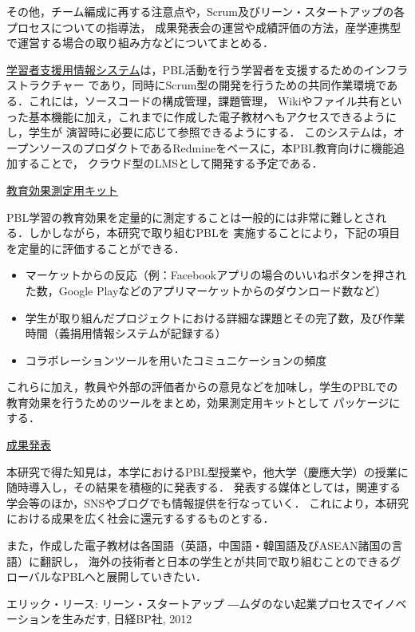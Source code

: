 \documentclass[11pt,a4paper,twoside]{jarticle}
\newcommand{\研究種別}{A}	%
\newcommand{\研究課題名}{コ・クリエイティブなソフトウェア開発者を育成するPBL型教育}
\newcommand{\研究機関名}{産業技術大学院大学}
\newcommand{\研究代表者氏名}{中鉢　欣秀}
\newcommand{\研究代表者氏名ふりがな}{ちゅうばち　よしひで}
\newcommand{\本応募effort}{\KLEffort{18}}	%
\newcommand{\研究期間の最終元号年度}{27}	%
\begin{document}
{	その他，チーム編成に再する注意点や，Scrum及びリーン・スタートアップの各プロセスについての指導法，
	成果発表会の運営や成績評価の方法，産学連携型で運営する場合の取り組み方などについてまとめる．
	
	\vspace{0.5cm}
	\underline{学習者支援用情報システム}は，PBL活動を行う学習者を支援するためのインフラストラクチャー
	であり，同時にScrum型の開発を行うための共同作業環境である．これには，ソースコードの構成管理，課題管理，
	Wikiやファイル共有といった基本機能に加え，これまでに作成した電子教材へもアクセスできるようにし，学生が
	演習時に必要に応じて参照できるようにする．
	このシステムは，オープンソースのプロダクトであるRedmineをベースに，本PBL教育向けに機能追加することで，
	クラウド型のLMSとして開発する予定である．

	\vspace{0.5cm}
	\underline{教育効果測定用キット}
	
	PBL学習の教育効果を定量的に測定することは一般的には非常に難しとされる．しかしながら，本研究で取り組むPBLを
	実施することにより，下記の項目を定量的に評価することができる．
	
	\begin{itemize}
	  \item マーケットからの反応（例：Facebookアプリの場合のいいねボタンを押された数，Google Playなどのアプリマーケットからのダウンロード数など）
	  \item 学生が取り組んだプロジェクトにおける詳細な課題とその完了数，及び作業時間（義捐用情報システムが記録する）
	  \item コラボレーションツールを用いたコミュニケーションの頻度
	\end{itemize}
	
	これらに加え，教員や外部の評価者からの意見などを加味し，学生のPBLでの教育効果を行うためのツールをまとめ，効果測定用キットとして
	パッケージにする．
	
	\vspace{0.5cm}
	\underline{成果発表}
	
	本研究で得た知見は，本学におけるPBL型授業や，他大学（慶應大学）の授業に随時導入し，その結果を積極的に発表する．
	発表する媒体としては，関連する学会等のほか，SNSやブログでも情報提供を行なっていく．
	これにより，本研究における成果を広く社会に還元するするものとする．
	
	また，作成した電子教材は各国語（英語，中国語・韓国語及びASEAN諸国の言語）に翻訳し，
	海外の技術者と日本の学生とが共同で取り組むことのできるグローバルなPBLへと展開していきたい．
	
	\vspace{1cm}
	\begin{thebibliography}{99}
		 エリック・リース: リーン・スタートアップ ―ムダのない起業プロセスでイノベーションを生みだす, 日経BP社, 2012
	\end{thebibliography}

}
\end{document}

